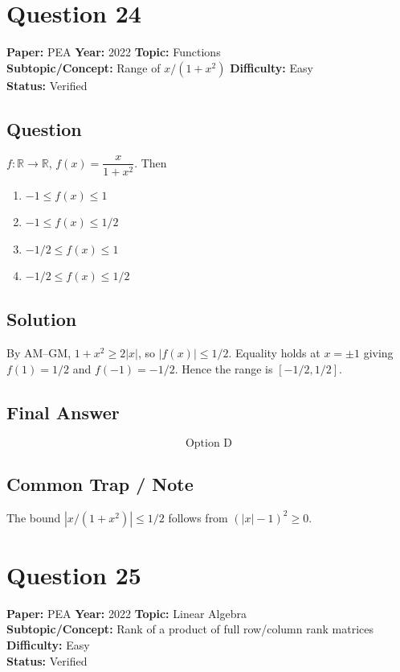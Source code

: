 \documentclass[11pt]{article}
\begin{document}
\section*{Question 24}
\textbf{Paper:} PEA \quad \textbf{Year:} 2022 \quad \textbf{Topic:} Functions \\
\textbf{Subtopic/Concept:} Range of $x/(1+x^2)$ \quad \textbf{Difficulty:} Easy \\
\textbf{Status:} Verified

\subsection*{Question}
$f : \mathbb R \to \mathbb R$, $f(x) = \dfrac{x}{1+x^2}$. Then
\begin{enumerate}[label=(\Alph*)]
\item $-1 \leq f(x) \leq 1$
\item $-1 \leq f(x) \leq 1/2$
\item $-1/2 \leq f(x) \leq 1$
\item $-1/2 \leq f(x) \leq 1/2$
\end{enumerate}

\subsection*{Solution}
By AM--GM, $1 + x^2 \geq 2|x|$, so $|f(x)| \leq 1/2$. Equality holds at $x = \pm 1$ giving
$f(1) = 1/2$ and $f(-1) = -1/2$. Hence the range is $[-1/2, 1/2]$.

\subsection*{Final Answer}
\[
\boxed{\text{Option D}}
\]

\subsection*{Common Trap / Note}
The bound $|x/(1+x^2)| \leq 1/2$ follows from $(|x|-1)^2 \geq 0$.

\section*{Question 25}
\textbf{Paper:} PEA \quad \textbf{Year:} 2022 \quad \textbf{Topic:} Linear Algebra \\
\textbf{Subtopic/Concept:} Rank of a product of full row/column rank matrices \quad \textbf{Difficulty:} Easy \\
\textbf{Status:} Verified
\end{document}
